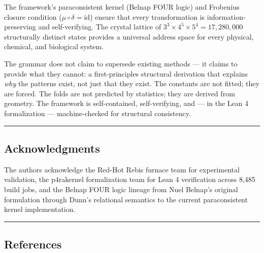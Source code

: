 The framework's paraconsistent kernel (Belnap FOUR logic) and Frobenius
closure condition (\(\mu \circ \delta = \text{id}\)) ensure that every
transformation is information-preserving and self-verifying. The crystal
lattice of \(3^3 \times 4^5 \times 5^4 = 17,280,000\) structurally
distinct states provides a universal address space for every physical,
chemical, and biological system.

The grammar does not claim to supersede existing methods --- it claims
to provide what they cannot: a first-principles structural derivation
that explains \emph{why} the patterns exist, not just that they exist.
The constants are not fitted; they are forced. The folds are not
predicted by statistics; they are derived from geometry. The framework
is self-contained, self-verifying, and --- in the Lean 4 formalization
--- machine-checked for structural consistency.

\begin{center}\rule{0.5\linewidth}{0.5pt}\end{center}

\hypertarget{acknowledgments}{%
\subsection{Acknowledgments}\label{acknowledgments}}

The authors acknowledge the Red-Hot Rebis furnace team for experimental
validation, the p4rakernel formalization team for Lean 4 verification
across 8,485 build jobs, and the Belnap FOUR logic lineage from Nuel
Belnap's original formulation through Dunn's relational semantics to the
current paraconsistent kernel implementation.

\begin{center}\rule{0.5\linewidth}{0.5pt}\end{center}

\hypertarget{references}{%
\subsection{References}\label{references}}

